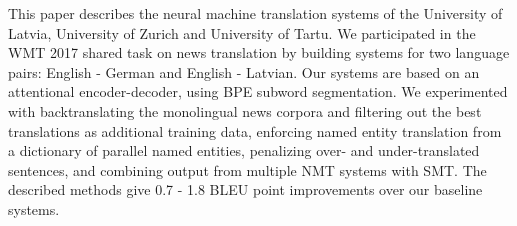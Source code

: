This paper describes the neural machine translation systems of the University of Latvia, University of Zurich and University of Tartu. We participated in the WMT 2017 shared task on news translation by building systems for two language pairs: English - German and English - Latvian. Our systems are based on an attentional encoder-decoder, using BPE subword segmentation. We experimented with backtranslating the monolingual news corpora and filtering out the best translations as additional training data, enforcing named entity translation from a dictionary of parallel named entities, penalizing over- and under-translated sentences, and combining output from multiple NMT systems with SMT. The described methods give 0.7 - 1.8 BLEU point improvements over our baseline systems.
